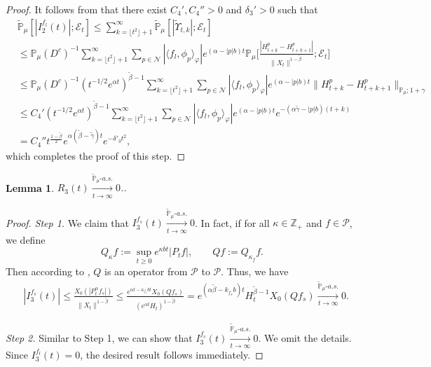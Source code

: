 \documentclass[12pt,a4paper]{amsart}
\theoremstyle{plain}
\newtheorem{lem}[thm]{Lemma}
\theoremstyle{definition}
\numberwithin{equation}{section}
\begin{document}
\begin{proof}
 It follows from \cite[Lemma 3.3]{RenSongSunZhao2019Stable} that there exist $C_4',C_4''>0$ and $\delta_3'>0$ such that
  \begin{align}
    &\widetilde {\mathbb {P}}_\mu[ | I_{2}^{f_l}(t)|; \mathcal {E}_t]
      \leq \sum_{k = \lfloor t^2\rfloor+1}^\infty \widetilde {\mathbb {P}}_\mu[ |\widetilde {\Upsilon}_{t,k}|; \mathcal {E}_t]
    \\ & \leq \mathbb P_\mu(D^c)^{-1} \sum_{k = \lfloor t^2\rfloor+1}^\infty \sum_{p \in \mathcal N} |\langle f_l,\phi_p\rangle_\varphi| e^{(\alpha - |p|b)t}\mathbb {P}_\mu\Big[\frac{ |H_{t+k}^p - H_{t+k+1}^p|}{\|X_t\|^{1- \tilde \beta}}; \mathcal E_t\Big]
    \\ & \leq \mathbb P_\mu(D^c)^{-1} (t^{-1/2}e^{\alpha t})^{\tilde{\beta}-1} \sum_{k = \lfloor t^2\rfloor+1}^\infty \sum_{p \in \mathcal N} |\langle f_l,\phi_p\rangle_\varphi| e^{(\alpha - |p|b)t}\|H_{t+k}^p - H_{t+k+1}^p\|_{\mathbb P_\mu; 1+\gamma}
    \\ & \leq C_4' (t^{-1/2}e^{\alpha t})^{\tilde{\beta}-1} \sum_{k = \lfloor t^2\rfloor+1}^\infty \sum_{p \in \mathcal N} |\langle f_l,\phi_p\rangle_\varphi| e^{(\alpha - |p|b)t} e^{- (\alpha \tilde \gamma - |p|b)(t+k)}
    \\ & = C_4''t^{\frac{1-\tilde{\beta}}{2}} e^{ \alpha (\tilde \beta - \tilde \gamma) t }e^{- \delta'_3 t^2},
  \end{align}
 which completes the proof of this step.
\end{proof}
\begin{lem}\label{lem: U3T}
 $R_3(t) \xrightarrow[t\to \infty]{\widetilde {\mathbb P}_\mu \text{-} a.s.} 0$..
\end{lem}
\begin{proof}
\emph{Step 1.} We claim that $I^{f_s}_3(t) \xrightarrow[t\to \infty]{\widetilde {\mathbb P}_\mu \text{-} a.s.} 0$.
  In fact, if for all $\kappa \in \mathbb Z_+$ and $f\in \mathcal P$, we define
\begin{equation}
\label{eq:Q}
  	Q_\kappa f
  	:= \sup_{t\geq 0} e^{\kappa b t}|P_t f|,
  	\qquad  Q f
  	:= Q_{\kappa_f}f.
\end{equation}
	Then according to \cite[Fact 1.2]{MarksMilos2018CLT}, $Q$ is an operator from $\mathcal P$ to $\mathcal P$. Thus,  we have
  \begin{align}
    & |I^{f_s}_3(t)|
      \leq \frac{X_0(|P^\alpha_tf_s|)}{\|X_t\|^{1 - \tilde \beta }}
      \leq \frac{e^{\alpha t - \kappa_{f_s} b t}X_0(Qf_s)}{(e^{\alpha t} H_t)^{1 - \tilde \beta}}
      = e^{(\alpha \tilde \beta - k_{f_s}b)t} H_t^{\tilde \beta - 1} X_0(Qf_s)
      \xrightarrow[t\to \infty]{\widetilde {\mathbb P}_\mu \text{-} a.s.} 0.
  \end{align}

  \emph{Step 2.} Similar to Step 1, we can show that $I^{f_c}_3(t) \xrightarrow[t\to \infty]{\widetilde {\mathbb P}_\mu \text{-} a.s.} 0$.
  We omit the details.
Since $I_3^{f_l}(t)=0$, the desired result follows immediately.
\end{proof}
\end{document}
